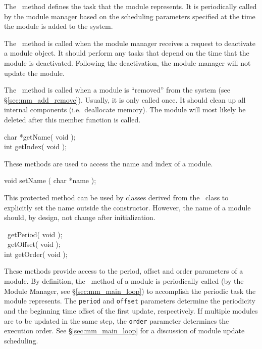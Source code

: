 The \updateFN\ method defines the task that the module represents. It is
periodically called by the module manager based on the scheduling parameters
specified at the time the module is added to the system.

The \deactivateFN\ method is called when the module manager receives a
request to deactivate a module object. It should perform any tasks that
depend on the time that the module is deactivated. Following the
deactivation, the module manager will not update the module.

The \uninitFN\ method is called when a module is ``removed'' from the system
(see \S\ref{sec:mm_add_remove}). Usually, it is only called once. It should
clean up all internal components (i.e.\ deallocate memory). The module will
most likely be deleted after this member function is called.

\begin{prototype}
char *getName( void ); \\
int   getIndex( void ); \\
\end{prototype}

These methods are used to access the name and index of a module.

\begin{prototype}
void setName ( char *name );
\end{prototype}

This protected method can be used by classes derived from the \Module\ class
to explicitly set the name outside the constructor. However, the name of a
module should, by design, not change after initialization.

\begin{prototype}
\mmstep\ getPeriod( void ); \\
\mmstep\ getOffset( void ); \\
int     getOrder( void );
\end{prototype}

These methods provide access to the period, offset and order parameters of a
module. By definition, the \updateFN\ method of a module is periodically
called (by the Module Manager, see \S\ref{sec:mm_main_loop}) to accomplish the
periodic task the module represents. The {\tt period} and {\tt offset}
parameters determine the periodicity and the beginning time offset of the
first update, respectively. If multiple modules are to be updated in the
same step, the {\tt order} parameter determines the execution order. See
\S\ref{sec:mm_main_loop} for a discussion of module update scheduling.

